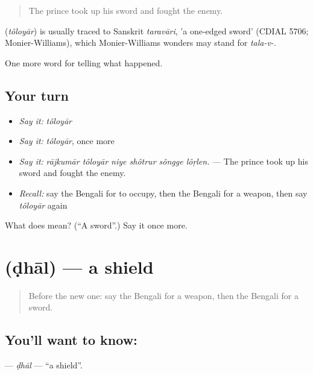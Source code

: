 \begin{quote}
The prince took up his sword and fought the enemy.
\end{quote}

\begin{cousinweb}
\textbf{} (\emph{tôloyār}) is usually traced to Sanskrit \emph{taravāri}, 'a one-edged sword' (CDIAL 5706; Monier-Williams), which Monier-Williams wonders may stand for \emph{tala-v-}.
\end{cousinweb}

\begin{grammarlens}[title={What you've built}]
One more word for telling what happened.
\end{grammarlens}

\subsection*{Your turn}
\begin{itemize}
\raggedright
  \item \emph{Say it:} \emph{tôloyār}
  \item \emph{Say it:} \emph{tôloyār}, once more
  \item \emph{Say it:} \emph{rājkumār tôloyār niye shôtrur sôngge lôṛlen.} — The prince took up his sword and fought the enemy.
  \item \emph{Recall:} say the Bengali for to occupy, then the Bengali for a weapon, then say \emph{tôloyār} again
\end{itemize}

\begin{tcolorbox}[breakable,colback=teal!4,colframe=teal!35!black,title={Before you move on}]
What does  mean? (\textquotedblleft{}A sword\textquotedblright{}.) Say it once more.
\end{tcolorbox}
\section[\texorpdfstring{\bn{ঢাল} (ḍhāl)}{ঢাল (ḍhāl)}]{ (ḍhāl) — a shield}

\label{lesson:BN-C315-dhal}



\begin{quote}
Before the new one: say the Bengali for a weapon, then the Bengali for a sword.
\end{quote}

\subsection*{You'll want to know: }
\textbf{} — \emph{ḍhāl} — \textquotedblleft{}a shield\textquotedblright{}.

